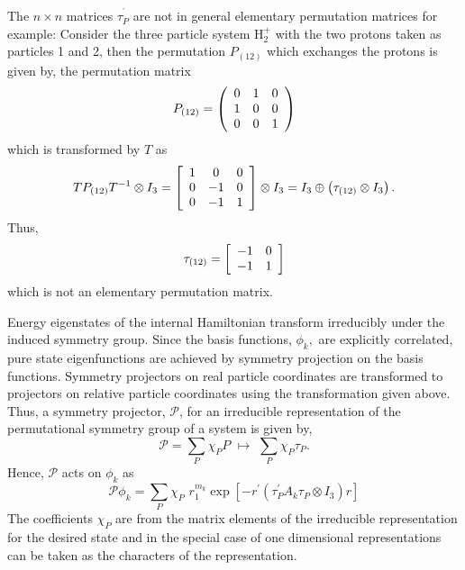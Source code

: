 \documentclass[12pt]{article}
\begin{document}
The $n\times n$ matrices $\tau_{P}^{^{\prime}}$ are not in general elementary
permutation matrices for example: Consider the three particle system
H$_{2}^{+}$ with the two protons taken as particles 1 and 2, then the
permutation $P_{(12)}$ which exchanges the protons is given by, the
permutation matrix
\begin{equation}
P_{(12)}=\left(
\begin{array}
[c]{ccc}%
0 & 1 & 0\\
1 & 0 & 0\\
0 & 0 & 1
\end{array}
\right)
\end{equation}
which is transformed by $T$ as
\begin{equation}
TP_{\left(  12\right)  }T^{-1}\otimes I_{3}=\left[
\begin{array}
[c]{ccc}%
1 & 0 & 0\\
0 & -1 & 0\\
0 & -1 & 1
\end{array}
\right]  \otimes I_{3}=I_{3}\oplus\left(  \tau_{\left(  12\right)  }\otimes
I_{3}\right)  .
\end{equation}
Thus,
\begin{equation}
\tau_{\left(  12\right)  }=\left[
\begin{array}
[c]{cc}%
-1 & 0\\
-1 & 1
\end{array}
\right]
\end{equation}
which is not an elementary permutation matrix.

Energy eigenstates of the internal Hamiltonian transform irreducibly under the
induced symmetry group. Since the basis functions, $\phi_{k},$ are explicitly
correlated, pure state eigenfunctions are achieved by symmetry projection on
the basis functions. Symmetry projectors on real particle coordinates are
transformed to projectors on relative particle coordinates using the
transformation given above. Thus, a symmetry projector, $\mathcal{P}$, for an
irreducible representation of the permutational symmetry group of a system is
given by,
\begin{equation}
\mathcal{P}=\sum_{P}\chi_{P}P\,\,\mapsto\,\,\sum_{P}\chi_{P}\tau_{P}.
\end{equation}
Hence, $\mathcal{P}$ acts on $\phi_{k}$ as
\begin{equation}
\mathcal{P}\phi_{k}=\sum_{P}\chi_{P}\,\,r_{1}^{m_{k}}\exp\left[  -r^{\prime
}\left(  \tau_{P}^{\prime}A_{k}\tau_{P}\otimes I_{3}\right)  r\right]
\end{equation}
The coefficients $\chi_{P}$ are from the matrix elements of the irreducible
representation for the desired state and in the special case of one
dimensional representations can be taken as the characters of the representation.
\end{document}
